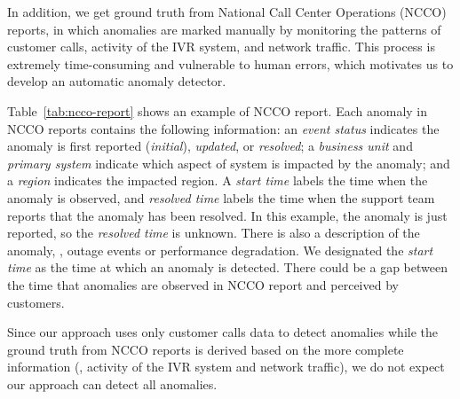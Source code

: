 

In addition, we get ground truth from National Call Center Operations 
(NCCO) reports, in which anomalies are marked manually by monitoring 
the patterns of customer calls, activity of the IVR system, and network traffic. This process is
extremely time-consuming and vulnerable to human errors, which
motivates us to develop an automatic anomaly detector.

Table~\ref{tab:ncco-report} shows an example of NCCO report.
Each anomaly in NCCO reports contains the following information: 
an {\em event status} indicates the anomaly is first reported ({\em initial}),
{\em updated}, or {\em resolved}; a {\em business unit} and {\em primary system} indicate which aspect of system
is impacted by the anomaly; and a {\em region} indicates the impacted region.
A {\em start time} labels the time when the anomaly is observed, and
{\em resolved time} labels the time when the support team reports
that the anomaly has been resolved. In this example, the anomaly is just reported,
so the {\em resolved time} is unknown. There is also a description of the
anomaly, \eg, outage events or performance  degradation. 
We designated the {\em start time} as the time at which an anomaly
is detected. There could be a gap between the time that anomalies are observed 
in NCCO report and perceived by customers.

Since our approach uses only customer calls data to detect anomalies
while the ground truth from NCCO reports is derived based on the more
complete information (\eg, activity of the IVR system and network traffic), 
we do not expect our approach can detect all anomalies.

